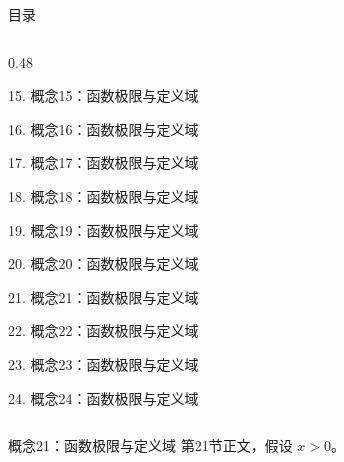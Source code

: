 \documentclass[aspectratio=169,10pt,fontset=fandol]{ctexbeamer}
\begin{document}
\begin{frame}[t,fragile]{目录}
\begin{columns}[T,onlytextwidth]
\begin{column}{0.48\textwidth}
{\color{black}\small 15. 概念15：函数极限与定义域\par}\vspace{0.22em}
{\color{black}\small 16. 概念16：函数极限与定义域\par}\vspace{0.22em}
{\color{black}\small 17. 概念17：函数极限与定义域\par}\vspace{0.22em}
{\color{black}\small 18. 概念18：函数极限与定义域\par}\vspace{0.22em}
{\color{black}\small 19. 概念19：函数极限与定义域\par}\vspace{0.22em}
{\color{black}\small 20. 概念20：函数极限与定义域\par}\vspace{0.22em}
{\color{blue}\small 21. 概念21：函数极限与定义域\par}\vspace{0.22em}
{\color{gray!40}\small 22. 概念22：函数极限与定义域\par}\vspace{0.22em}
{\color{gray!40}\small 23. 概念23：函数极限与定义域\par}\vspace{0.22em}
{\color{gray!40}\small 24. 概念24：函数极限与定义域\par}\vspace{0.22em}
\end{column}
\end{columns}
\end{frame}
\begin{frame}[t,fragile]{概念21：函数极限与定义域}
\normalsize
{\normalsize
第21节正文，假设 $x>0$。
}
\end{frame}
\end{document}
